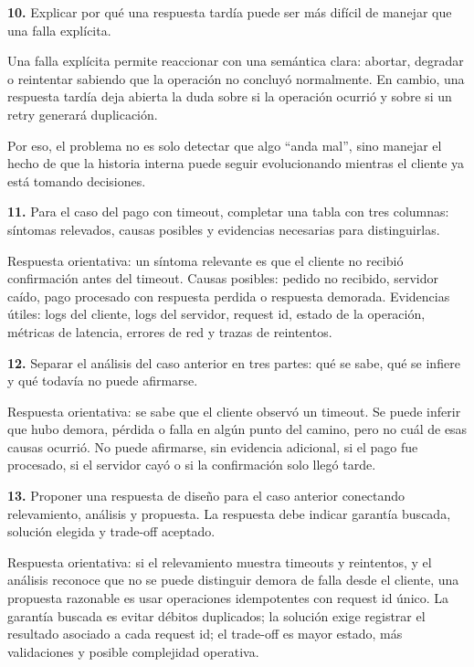 \documentclass[variant=guia,cover=institutional,mode=screen]{ua-engineering-v6-article}
\begin{document}
\begin{uaexercise}
\textbf{10.}
Explicar por qué una respuesta tardía puede ser más difícil de manejar que una falla explícita.
\end{uaexercise}
\begin{uaanswer}
Una falla explícita permite reaccionar con una semántica clara: abortar, degradar o reintentar sabiendo que la operación no concluyó normalmente.
En cambio, una respuesta tardía deja abierta la duda sobre si la operación ocurrió y sobre si un retry generará duplicación.

Por eso, el problema no es solo detectar que algo “anda mal”, sino manejar el hecho de que la historia interna puede seguir evolucionando mientras el cliente ya está tomando decisiones.
\end{uaanswer}

\begin{uaexercise}
\textbf{11.}
Para el caso del pago con timeout, completar una tabla con tres columnas: síntomas relevados, causas posibles y evidencias necesarias para distinguirlas.
\end{uaexercise}
\begin{uaanswer}
Respuesta orientativa: un síntoma relevante es que el cliente no recibió confirmación antes del timeout.
Causas posibles: pedido no recibido, servidor caído, pago procesado con respuesta perdida o respuesta demorada.
Evidencias útiles: logs del cliente, logs del servidor, request id, estado de la operación, métricas de latencia, errores de red y trazas de reintentos.
\end{uaanswer}

\begin{uaexercise}
\textbf{12.}
Separar el análisis del caso anterior en tres partes: qué se sabe, qué se infiere y qué todavía no puede afirmarse.
\end{uaexercise}
\begin{uaanswer}
Respuesta orientativa: se sabe que el cliente observó un timeout.
Se puede inferir que hubo demora, pérdida o falla en algún punto del camino, pero no cuál de esas causas ocurrió.
No puede afirmarse, sin evidencia adicional, si el pago fue procesado, si el servidor cayó o si la confirmación solo llegó tarde.
\end{uaanswer}

\begin{uaexercise}
\textbf{13.}
Proponer una respuesta de diseño para el caso anterior conectando relevamiento, análisis y propuesta.
La respuesta debe indicar garantía buscada, solución elegida y trade-off aceptado.
\end{uaexercise}
\begin{uaanswer}
Respuesta orientativa: si el relevamiento muestra timeouts y reintentos, y el análisis reconoce que no se puede distinguir demora de falla desde el cliente, una propuesta razonable es usar operaciones idempotentes con request id único.
La garantía buscada es evitar débitos duplicados; la solución exige registrar el resultado asociado a cada request id; el trade-off es mayor estado, más validaciones y posible complejidad operativa.
\end{uaanswer}
\end{document}
